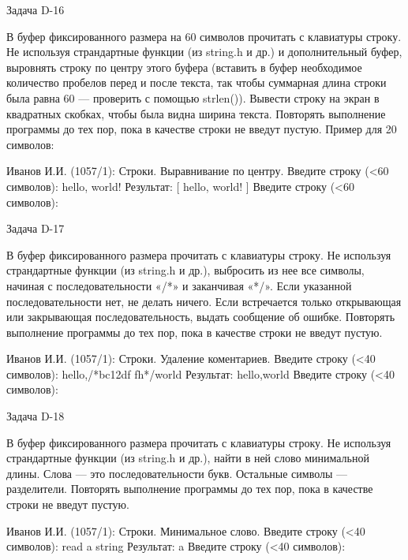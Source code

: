 
Задача D-16

В буфер фиксированного размера на 60 символов прочитать с клавиатуры строку.
Не используя страндартные функции (из string.h и др.) и дополнительный буфер,
выровнять строку по центру этого буфера (вставить в буфер необходимое
количество пробелов перед и после текста, так чтобы суммарная длина строки
была равна 60 — проверить с помощью strlen()). Вывести строку на экран в
квадратных скобках, чтобы была видна ширина текста. Повторять выполнение
программы до тех пор, пока в качестве строки не введут пустую. Пример для 20
символов:

Иванов И.И. (1057/1): Строки. Выравнивание по центру.
Введите строку (<60 символов): hello, world!
Результат: [    hello, world!   ]
Введите строку (<60 символов):


Задача D-17

В буфер фиксированного размера прочитать с клавиатуры строку. Не используя
страндартные функции (из string.h и др.), выбросить из нее все символы,
начиная с последовательности «/*» и заканчивая «*/». Если указанной
последовательности нет, не делать ничего. Если встречается только открывающая
или закрывающая последовательность, выдать сообщение об ошибке. Повторять
выполнение программы до тех пор, пока в качестве строки не введут пустую.

Иванов И.И. (1057/1): Строки. Удаление коментариев.
Введите строку (<40 символов): hello,/*bc12df fh*/world
Результат: hello,world
Введите строку (<40 символов):


Задача D-18

В буфер фиксированного размера прочитать с клавиатуры строку. Не используя
страндартные функции (из string.h и др.), найти в ней слово минимальной длины.
Слова — это последовательности букв. Остальные символы — разделители.
Повторять выполнение программы до тех пор, пока в качестве строки не введут
пустую.

Иванов И.И. (1057/1): Строки. Минимальное слово.
Введите строку (<40 символов): read a string
Результат: a
Введите строку (<40 символов):


